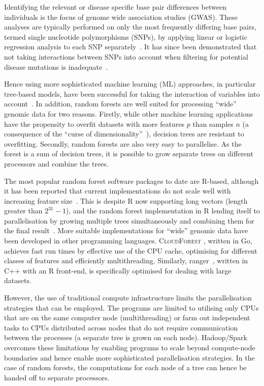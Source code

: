 \documentclass[a4paper]{amsart}
\begin{document}
Identifying the relevant or disease specific base pair differences between individuals is the focus of genome wide
association studies (GWAS).  These analyses are typically performed on only the most frequently differing base pairs,
termed single nucleotide polymorphisms (SNPs), by applying linear or logistic regression analysis to each SNP
separately~\cite{CCC2007}.  It has since been demonstrated that not taking interactions between SNPs into account
when filtering for potential disease mutations is inadequate~\cite{Manolio2009,Yang2011}.

Hence using more sophisticated machine learning (ML) approaches, in particular tree-based models, have been successful
for taking the interaction of variables into account~\cite{Wright.et.al.2016}. In addition, random forests are well
suited for processing ``wide'' genomic data for two reasons.  Firstly, while other machine learning applications have
the propensity to overfit datasets with more features $p$ than samples $n$ (a consequence of the ``curse of
dimensionality''~\cite{Bauer2014, bellman1961adaptive}), decision trees are resistant to overfitting.  Secondly, random
forests are also very easy to parallelise. As the forest is a sum of decision trees, it is possible to grow separate
trees on different processors and combine the trees. 

The most popular random forest software packages to date are R-based, although it has been reported that current implementations 
do not scale well with increasing feature size~\cite{Wright.and.Ziegle.2016}.  This is despite R now supporting long vectors (length greater
than $2^{31}-1$), and the random forest implementation in R lending itself to parallelisation by growing multiple
trees simultaneously and combining them for the final result~\cite{Liaw.and.Weiner.2002}.  More suitable implementations for ``wide''
genomic data have been developed in other programming languages. \textsc{CloudForest} \cite{Bressler2015}, written in Go,
achieves fast run times by effective use of the CPU cache, optimising for different classes of features and efficiently
multithreading.  Similarly, ranger~\cite{Wright.and.Ziegle.2016}, written in C++ with an R front-end, is
specifically optimised for dealing with large datasets.

However, the use of traditional compute infrastructure limits the parallelisation strategies that can be employed.  
The programs are limited to utilising only CPUs that are on the same computer node (multithreading) or
farm out independent tasks to CPUs distributed across nodes that do not require communication between the
processes (a separate tree is grown on each node).
Hadoop/Spark overcomes these limitations by enabling programs to
scale beyond compute-node boundaries and hence enable more sophisticated parallelisation strategies.  In the case of
random forests, the computations for each node of a tree can hence be handed off to separate processors.
 
\end{document}

